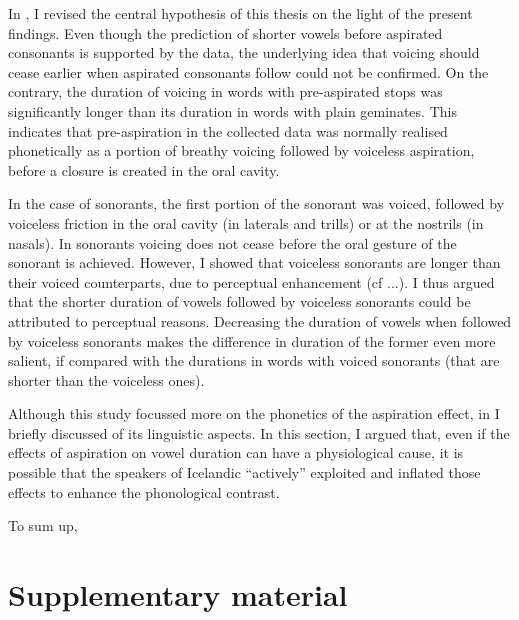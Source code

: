 \documentclass[11pt,a4paper,openany]{memoir}\usepackage[]{graphicx}\usepackage[]{color}
\begin{document}
In , I revised the central hypothesis of this thesis on the light of the present findings.
Even though the prediction of shorter vowels before aspirated consonants is supported by the data, the underlying idea that voicing should cease earlier when aspirated consonants follow could not be confirmed.
On the contrary, the duration of voicing in words with pre-aspirated stops was significantly longer than its duration in words with plain geminates.
This indicates that pre-aspiration in the collected data was normally realised phonetically as a portion of breathy voicing followed by voiceless aspiration, before a closure is created in the oral cavity.

In the case of sonorants, the first portion of the sonorant was voiced, followed by voiceless friction in the oral cavity (in laterals and trills) or at the nostrils (in nasals).
In sonorants voicing does not cease before the oral gesture of the sonorant is achieved.
However, I showed that voiceless sonorants are longer than their voiced counterparts, due to perceptual enhancement (cf ...).
I thus argued that the shorter duration of vowels followed by voiceless sonorants could be attributed to perceptual reasons.
Decreasing the duration of vowels when followed by voiceless sonorants makes the difference in duration of the former even more salient, if compared with the durations in words with voiced sonorants (that are shorter than the voiceless ones).

Although this study focussed more on the phonetics of the aspiration effect, in  I briefly discussed of its linguistic aspects.
In this section, I argued that, even if the effects of aspiration on vowel duration can have a physiological cause, it is possible that the speakers of Icelandic ``actively'' exploited and inflated those effects to enhance the phonological contrast.


To sum up, 












\appendix


\chapter{Supplementary material}
\end{document}
